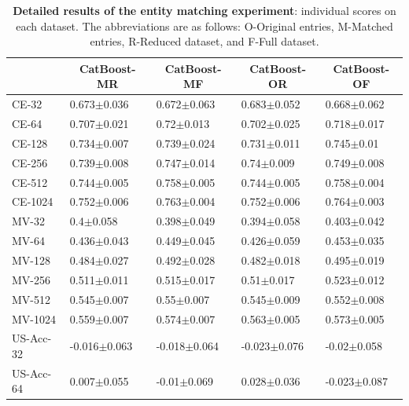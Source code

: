 \documentclass{article}
\theoremstyle{plain}
\theoremstyle{definition}
\theoremstyle{remark}
\begin{document}
\begin{table}[!h]\footnotesize
\caption{\textbf{Detailed results of the entity matching experiment}: individual scores on each dataset. The abbreviations are as follows: O-Original entries, M-Matched entries, R-Reduced dataset, and F-Full dataset.%
\label{tab:matching}
}
\vspace{0.1in}
\begin{center}
    \begin{tabular}{lllll}
    \toprule
    {} &     \multicolumn{1}{c}{\textbf{CatBoost-MR}} &     \multicolumn{1}{c}{\textbf{CatBoost-MF}} &     \multicolumn{1}{c}{\textbf{CatBoost-OR}} &     \multicolumn{1}{c}{\textbf{CatBoost-OF}} \\
    \midrule
    CE-32        &   0.673$\pm$0.036 &   0.672$\pm$0.063 &   0.683$\pm$0.052 &   0.668$\pm$0.062 \\
    CE-64        &   0.707$\pm$0.021 &    0.72$\pm$0.013 &   0.702$\pm$0.025 &   0.718$\pm$0.017 \\
    CE-128       &   0.734$\pm$0.007 &   0.739$\pm$0.024 &   0.731$\pm$0.011 &    0.745$\pm$0.01 \\
    CE-256       &   0.739$\pm$0.008 &   0.747$\pm$0.014 &    0.74$\pm$0.009 &   0.749$\pm$0.008 \\
    CE-512       &   0.744$\pm$0.005 &   0.758$\pm$0.005 &   0.744$\pm$0.005 &   0.758$\pm$0.004 \\
    CE-1024      &   0.752$\pm$0.006 &   0.763$\pm$0.004 &   0.752$\pm$0.006 &   0.764$\pm$0.003 \\
    \midrule
    MV-32        &     0.4$\pm$0.058 &   0.398$\pm$0.049 &   0.394$\pm$0.058 &   0.403$\pm$0.042 \\
    MV-64        &   0.436$\pm$0.043 &   0.449$\pm$0.045 &   0.426$\pm$0.059 &   0.453$\pm$0.035 \\
    MV-128       &   0.484$\pm$0.027 &   0.492$\pm$0.028 &   0.482$\pm$0.018 &   0.495$\pm$0.019 \\
    MV-256       &   0.511$\pm$0.011 &   0.515$\pm$0.017 &    0.51$\pm$0.017 &   0.523$\pm$0.012 \\
    MV-512       &   0.545$\pm$0.007 &    0.55$\pm$0.007 &   0.545$\pm$0.009 &   0.552$\pm$0.008 \\
    MV-1024      &   0.559$\pm$0.007 &   0.574$\pm$0.007 &   0.563$\pm$0.005 &   0.573$\pm$0.005 \\
    \midrule
    US-Acc-32    &  -0.016$\pm$0.063 &  -0.018$\pm$0.064 &  -0.023$\pm$0.076 &   -0.02$\pm$0.058 \\
    US-Acc-64    &   0.007$\pm$0.055 &   -0.01$\pm$0.069 &   0.028$\pm$0.036 &  -0.023$\pm$0.087 \\

\end{tabular}
\end{center}
\end{table}
\end{document}
